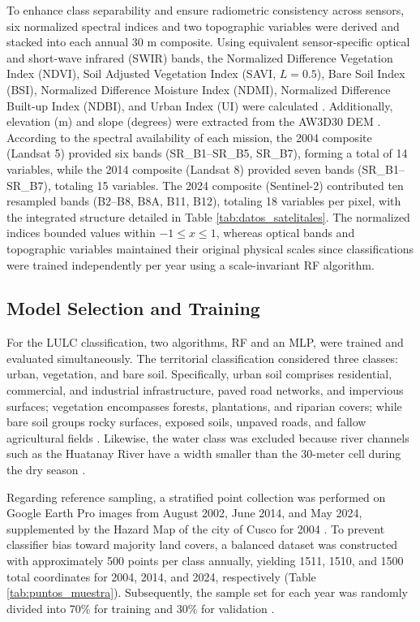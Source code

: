 \documentclass[runningheads]{llncs}
\begin{document}
To enhance class separability and ensure radiometric consistency across sensors, six normalized spectral indices and two topographic variables were derived and stacked into each annual $30\text{ m}$ composite. Using equivalent sensor-specific optical and short-wave infrared (SWIR) bands, the Normalized Difference Vegetation Index (NDVI), Soil Adjusted Vegetation Index (SAVI, $L = 0.5$), Bare Soil Index (BSI), Normalized Difference Moisture Index (NDMI), Normalized Difference Built-up Index (NDBI), and Urban Index (UI) were calculated \cite{000_multiple_studies}. Additionally, elevation (m) and slope (degrees) were extracted from the AW3D30 DEM \cite{014_NileEtiopia}. According to the spectral availability of each mission, the 2004 composite (Landsat 5) provided six bands (SR\_B1--SR\_B5, SR\_B7), forming a total of 14 variables, while the 2014 composite (Landsat 8) provided seven bands (SR\_B1--SR\_B7), totaling 15 variables. The 2024 composite (Sentinel-2) contributed ten resampled bands (B2--B8, B8A, B11, B12), totaling 18 variables per pixel, with the integrated structure detailed in Table \ref{tab:datos_satelitales}. The normalized indices bounded values within $-1 \leq x \leq 1$, whereas optical bands and topographic variables maintained their original physical scales since classifications were trained independently per year using a scale-invariant RF algorithm.

\subsection{Model Selection and Training}
\label{subsec:entrenamiento_seleccion_modelos}

For the LULC classification, two algorithms, RF and an MLP, were trained and evaluated simultaneously. The territorial classification considered three classes: urban, vegetation, and bare soil. Specifically, urban soil comprises residential, commercial, and industrial infrastructure, paved road networks, and impervious surfaces; vegetation encompasses forests, plantations, and riparian covers; while bare soil groups rocky surfaces, exposed soils, unpaved roads, and fallow agricultural fields \cite{010_forestKenia}. Likewise, the water class was excluded because river channels such as the Huatanay River have a width smaller than the 30-meter cell during the dry season \cite{606_CalvoPolo2017}.

Regarding reference sampling, a stratified point collection was performed on Google Earth Pro images \cite{568_Zafar_Egipto} from August 2002, June 2014, and May 2024, supplemented by the Hazard Map of the city of Cusco for 2004 \cite{INDECI_PNUD_2004_SuelosCusco}. To prevent classifier bias toward majority land covers, a balanced dataset was constructed with approximately 500 points per class annually, yielding 1511, 1510, and 1500 total coordinates for 2004, 2014, and 2024, respectively (Table \ref{tab:puntos_muestra}). Subsequently, the sample set for each year was randomly divided into 70\% for training and 30\% for validation \cite{568_Zafar_Egipto}.
\end{document}
